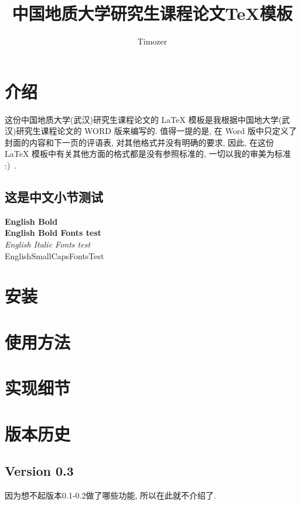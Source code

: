 \documentclass{cugrep}
\title{中国地质大学研究生课程论文\TeX{}模板}
\author{Timozer}
\begin{document}
\maketitle
\frontmatter
{}
\makeabstract 
\tableofcontents
\clearpage
\mainmatter

\chapter{介绍}
这份中国地质大学(武汉)研究生课程论文的 \LaTeX{} 模板是我根据中国地大学(武汉)研究生课程论文的 {\sc WORD} 版来编写的. 
值得一提的是, 在 {\sc Word} 版中只定义了封面的内容和下一页的评语表, 对其他格式并没有明确的要求, 因此, 
在这份 \LaTeX{} 模板中有关其他方面的格式都是没有参照标准的, 一切以我的审美为标准 :)~.

\section{这是中文小节测试}
{
\noindent
{\textbf{English Bold}}\\
{\bf English Bold Fonts test} \\
{\textit{English Italic Fonts test}}\\
{\sc EnglishSmallCapsFontsTest}}

\chapter{安装}

\chapter{使用方法}

\chapter{实现细节}

\chapter{版本历史}

\section{Version 0.3}
\label{sec:version_0_3}
因为想不起版本0.1-0.2做了哪些功能, 所以在此就不介绍了.
\end{document}
